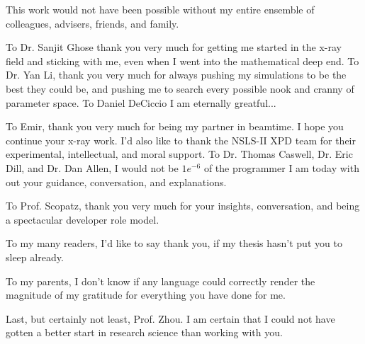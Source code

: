 This work would not have been possible without my entire ensemble of colleagues, advisers, friends, and family.

To Dr. Sanjit Ghose thank you very much for getting me started in the x-ray field and sticking with me, even when I went into the mathematical deep end.
To Dr. Yan Li, thank you very much for always pushing my simulations to be the best they could be, and pushing me to search every possible nook and cranny of parameter space.
To Daniel DeCiccio I am eternally greatful...

To Emir, thank you very much for being my partner in beamtime. I hope you continue your x-ray work.
I'd also like to thank the NSLS-II XPD team for their experimental, intellectual, and moral support.
To Dr. Thomas Caswell, Dr. Eric Dill, and Dr. Dan Allen, I would not be $1e^{-6}$ of the programmer I am today with out your guidance, conversation, and explanations.

To Prof. Scopatz, thank you very much for your insights, conversation, and being a spectacular developer role model.

To my many readers, I'd like to say thank you, if my thesis hasn't put you to sleep already.

To my parents, I don't know if any language could correctly render the magnitude of my gratitude for everything you have done for me.

Last, but certainly not least, Prof. Zhou.
I am certain that I could not have gotten a better start in research science than working with you.
